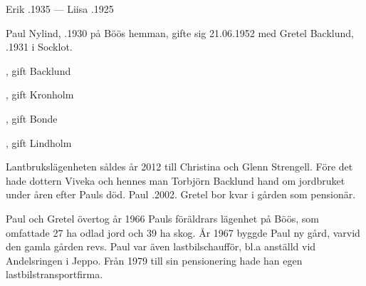 Erik .1935  ---  Liisa .1925



%



%
Paul Nylind, .1930 på Böös hemman, gifte sig 21.06.1952 med Gretel Backlund, .1931 i Socklot.
\begin{jhchildren}
  \item {}, gift Backlund
  \item {}, gift Kronholm
  \item {}, gift Bonde
  \item {}, gift Lindholm
\end{jhchildren}
Lantbrukslägenheten såldes år 2012 till Christina och Glenn Strengell. Före det hade dottern Viveka och hennes man Torbjörn Backlund hand om jordbruket under åren efter Pauls död. Paul .2002. Gretel bor kvar i gården som pensionär.


%
Paul och Gretel övertog år 1966 Pauls föräldrars lägenhet på Böös, som omfattade 27 ha odlad jord och 39 ha skog. År 1967 byggde Paul ny gård, varvid den gamla gården revs. Paul var även lastbilschaufför, bl.a anställd vid Andelsringen i Jeppo. Från 1979 till sin pensionering hade han egen lastbilstransportfirma.


%



